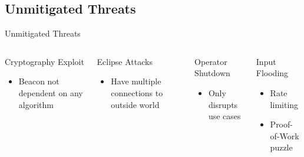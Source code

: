 \subsection{Unmitigated Threats}

\begin{frame}{Unmitigated Threats}
    \begin{columns}[T,onlytextwidth]

        \begin{block}{Cryptography Exploit}
            \begin{itemize}

                \item Beacon not dependent on any algorithm
            \end{itemize}
        \end{block}
        \pause
        \begin{block}{Eclipse Attacks}
            \begin{itemize}
                \item Have multiple connections to outside world
            \end{itemize}
        \end{block}

        \pause
        \begin{block}{Operator Shutdown}
            \begin{itemize}
                \item Only disrupts use cases
            \end{itemize}
        \end{block}

        \pause
        \begin{block}{Input Flooding}
          \begin{itemize}
              \item Rate limiting
              \item Proof-of-Work puzzle
          \end{itemize}
        \end{block}

    \end{columns}
\end{frame}

